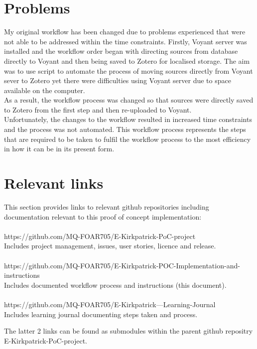 \documentclass{article}
\begin{document}
\section{Problems}
My original workflow has been changed due to problems experienced that were not able to be addressed within the time constraints. Firstly, Voyant server was installed and the workflow order began with directing sources from database directly to Voyant and then being saved to Zotero for localised storage. The aim was to use script to automate the process of moving sources directly from Voyant sever to Zotero yet there were difficulties using Voyant server due to space available on the computer.\\
As a result, the workflow process was changed so that sources were directly saved to Zotero from the first step and then re-uploaded to Voyant. \\
Unfortunately, the changes to the workflow resulted in increased time constraints and the process was not automated. This workflow process represents the steps that are required to be taken to fulfil the workflow process to the most efficiency in how it can be in its present form.

\section{Relevant links}
This section provides links to relevant github repositories including documentation relevant to this proof of concept implementation:\\
\\
https://github.com/MQ-FOAR705/E-Kirkpatrick-PoC-project\\
Includes project management, issues, user stories, licence and release.\\
\\
https://github.com/MQ-FOAR705/E-Kirkpatrick-POC-Implementation-and-instructions\\
Includes documented workflow process and instructions (this document).\\
\\
https://github.com/MQ-FOAR705/E-Kirkpatrick---Learning-Journal\\
Includes learning journal documenting steps taken and process.

The latter 2 links can be found as submodules within the parent github repositry E-Kirkpatrick-PoC-project.
\end{document}
